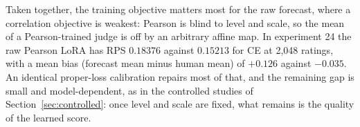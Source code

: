 Taken together, the training objective matters most for the raw forecast, where a correlation objective is weakest: Pearson is blind to level and scale, so the mean of a Pearson-trained judge is off by an arbitrary affine map.
In experiment 24 the raw Pearson LoRA has RPS $0.18376$ against $0.15213$ for CE at 2{,}048 ratings, with a mean bias (forecast mean minus human mean) of $+0.126$ against $-0.035$.
An identical proper-loss calibration repairs most of that, and the remaining gap is small and model-dependent, as in the controlled studies of Section~\ref{sec:controlled}: once level and scale are fixed, what remains is the quality of the learned score.
